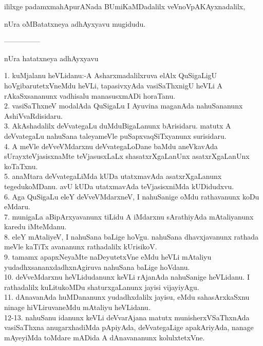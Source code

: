 \documentclass{article}
\begin{document}
\begin{center}
ililxge padamxmahApurANada BUmiKaMDadalilx veVnoVpAKAyxnadalilx,
\end{center}

\begin{center}
nUra oMBatatxneya adhAyxyavu mugidudu.
\end{center}

\begin{center}
---------------
\end{center}

\begin{center}
nUra hatatxneya adhAyxyavu
\end{center}

1. kuMjalanu heVLidanu:-A Asharxmadalilxruva elAlx QuSigaLigU hoVgibarutetxVneMdu heVLi, tapasivxyAda vasiSaThxnigU heVLi A rAkaSxsananunx vadhisalu manasusxmADi horaTanu.\\
2. vasiSaThxneV modalAda QuSigaLu I Ayuvina maganAda nahuSananunx AshiVvaRdisidaru.\\
3. AkAshadalilx deVvategaLu duMduBigaLanunx bArisidaru. matutx A deVvategaLu nahuSana taleyameVle puSapxvaqSiTxyanunx surisidaru.\\
4. A meVle deVveVMdarxnu deVvategaLoDane baMdu aneVkavAda sUrayxteVjasisxnaMte teVjasusxLaLx shasatxrXgaLanUnx asatxrXgaLanUnx koTaTxnu.\\
5. anaMtara deVvategaLiMda kUDa utatxmavAda asatxrXgaLanunx tegedukoMDanu. avU kUDa utatxmavAda teVjasisxniMda kUDidudxvu.\\
6. Aga QuSigaLu eleY deVveVMdarxneV, I nahuSanige oMdu rathavanunx koDu eMdaru.\\
7. munigaLa aBipArxyavanunx tiLidu A iMdarxnu sArathiyAda mAtaliyanunx karedu iMteMdanu.\\
8. eleY mAtaliyeV, I nahuSana baLige hoVgu. nahuSana dhavxjavanunx rathada meVle kaTiTx avananunx rathadalilx kUrisikoV.\\
9. tamamx apapxNeyaMte naDeyutetxVne eMdu heVLi mAtaliyu yudadhxsananxdadhxnAgiruva nahuSana baLige hoVdanu.\\
10. deVveMdarxnu heVLidudanunx keVLi rAjanAda nahuSanige heVLidanu. I rathadalilx kuLitukoMDu shaturxgaLanunx jayisi vijayiyAgu.\\
11. dAnavanAda huMDananunx yudadhxdalilx jayisu, eMdu sahasArxkaSxnu ninage hiVLiruvaneMdu mAtaliyu heVLidanu.\\
12-13. nahuSanu idanunx keVLi deVvarAjana matutx munisherxVSaThxnAda vasiSaThxna anugarxhadiMda pApiyAda, deVvategaLige apakAriyAda, nanage mAyeyiMda toMdare mADida A dAnavananunx kolulxtetxVne.\\
\end{document}
